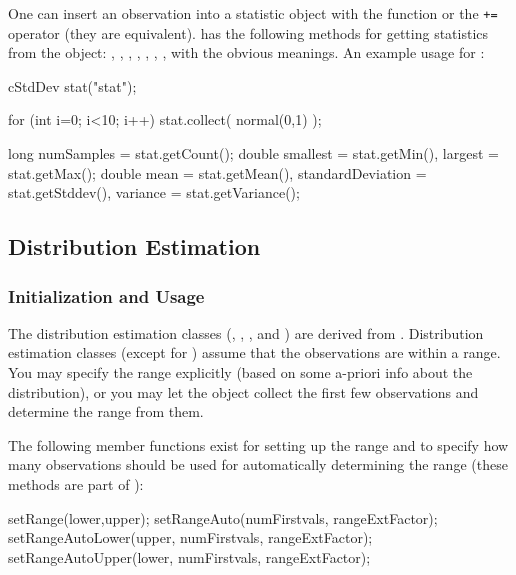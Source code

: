 One can insert an observation into a statistic object with the
 function or the \texttt{+=} operator (they are
equivalent).   has the following methods for getting
statistics from the object: , ,
, , , ,
,  with the obvious meanings. An example
usage for :

\begin{cpp}
cStdDev stat("stat");

for (int i=0; i<10; i++)
  stat.collect( normal(0,1) );

long numSamples = stat.getCount();
double smallest = stat.getMin(),
       largest = stat.getMax();
double mean = stat.getMean(),
       standardDeviation = stat.getStddev(),
       variance = stat.getVariance();
\end{cpp}





\subsection{Distribution Estimation}

\subsubsection{Initialization and Usage}


The distribution estimation classes
(, , ,
 and ) are derived from
. Distribution estimation classes (except for
) assume that the observations are within a range.
You may specify the range explicitly (based on some a-priori info
about the distribution), or you may let the object collect the first
few observations and determine the range from them.

The following member functions exist for setting up the range
and to specify how many observations should be used for automatically
determining the range (these methods are part of ):

\begin{cpp}
setRange(lower,upper);
setRangeAuto(numFirstvals, rangeExtFactor);
setRangeAutoLower(upper, numFirstvals, rangeExtFactor);
setRangeAutoUpper(lower, numFirstvals, rangeExtFactor);
\end{cpp}

